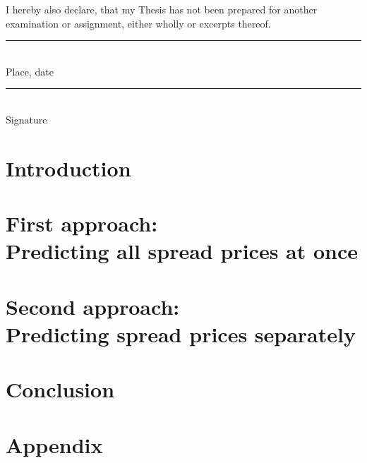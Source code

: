 \documentclass[abstract=true,caption=above]{scrreprt}
\begin{document}
I hereby also declare, that my Thesis has not been prepared for another examination
or assignment, either wholly or excerpts thereof.

\parbox{\textwidth}{
	\vspace{2cm}
	\parbox{7cm}{
		\rule{4cm}{1pt}\\
		Place, date
	}
	\hfill
	\parbox{7cm}{
		\rule{6cm}{1pt}\\
		Signature
	}
}

\tableofcontents

\setcounter{page}{1}

\listoffigures
\listoftables

\chapter{Introduction}
\setcounter{page}{1}


\chapter[First approach: Predicting all spread prices at once]{First approach: \\  Predicting all spread prices at once}
\label{ch:all-at-once}

\chapter[Second approach: Predicting spread prices separately]{Second approach: \\ Predicting spread prices separately}
\label{ch:one-at-once}


\chapter{Conclusion}


\printbibliography

\appendix
\chapter*{\centering Appendix}
\newpage

\end{document}
